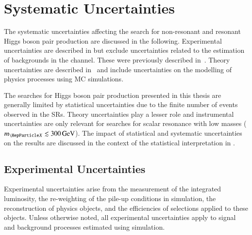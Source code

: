\section{Systematic Uncertainties}%
\label{sec:uncertainties}

The systematic uncertainties affecting the search for non-resonant and resonant
Higgs boson pair production are discussed in the following. Experimental
uncertainties are described in  but exclude
uncertainties related to the estimation of \faketauhadvis backgrounds in the
\hadhad channel. These were previously described
in~. Theory uncertainties are
described in~ and include uncertainties on the
modelling of physics processes using MC simulations.

The searches for Higgs boson pair production presented in this thesis are
generally limited by statistical uncertainties due to the finite number of
events observed in the SRs. Theory uncertainties play a lesser role and
instrumental uncertainties are only relevant for searches for scalar resonance
with low masses ($\mX \lesssim \SI{300}{\GeV}$). The impact of statistical and
systematic uncertainties on the results are discussed in the context of the
statistical interpretation in .


\subsection{Experimental Uncertainties}%
\label{sec:experimental_uncertainties}

Experimental uncertainties arise from the measurement of the integrated
luminosity, the re-weighting of the pile-up conditions in simulation, the
reconstruction of physics objects, and the efficiencies of selections applied to
these objects. Unless otherwise noted, all experimental uncertainties apply to
signal and background processes estimated using simulation.

